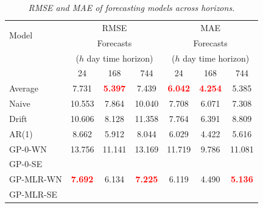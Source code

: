       \begin{table}[H]
         \centering
         \begin{tabular}{lcccccc}
         \hline
         \multirow{2}{*}{Model} & \multicolumn{3}{c}{RMSE} & \multicolumn{3}{c}{MAE} \\
         \cline{2-7}
         & \multicolumn{3}{c}{Forecasts} & \multicolumn{3}{c}{Forecasts} \\
         & \multicolumn{3}{c}{($h$ day time horizon)} & \multicolumn{3}{c}{($h$ day time horizon)} \\
         & 24 & 168 & 744 & 24 & 168 & 744 \\
         \hline
         Average & {7.731} & \textbf{\textcolor{red}{5.397}} & {7.439} & \textbf{\textcolor{red}{6.042}} & \textbf{\textcolor{red}{4.254}} & {5.385} \\
         Naive & {10.553} & {7.864} & {10.040} & {7.708} & {6.071} & {7.308} \\
         Drift & {10.606} & {8.128} & {11.358} & {7.764} & {6.391} & {8.809} \\
         AR(1) & {8.662} & {5.912} & {8.044} & {6.029} & {4.422} & {5.616} \\
         GP-0-WN & {13.756} & {11.141} & {13.169} & {11.719} & {9.786} & {11.081} \\
         GP-0-SE & {~} & {~} & {~} & {~} & {~} & {~} \\
         GP-MLR-WN & \textbf{\textcolor{red}{7.692}} & {6.134} & \textbf{\textcolor{red}{7.225}} & {6.119} & {4.490} & \textbf{\textcolor{red}{5.136}} \\
         GP-MLR-SE & {~} & {~} & {~} & {~} & {~} & {~} \\
         \hline
         \end{tabular}
         \caption{\textit{RMSE and MAE of forecasting models across horizons.}}
      \end{table}
